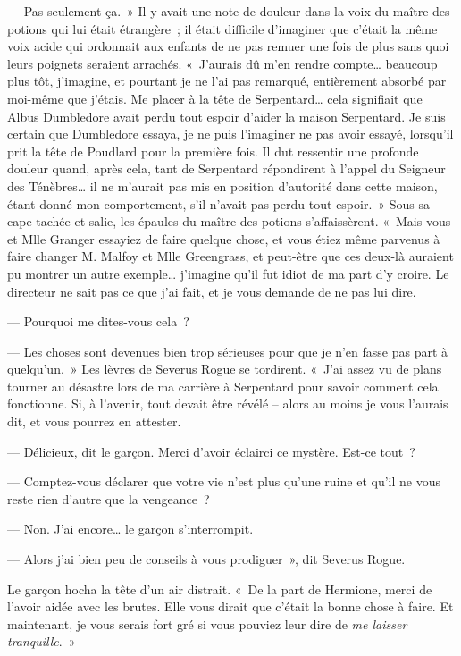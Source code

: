 --- Pas seulement ça.~» Il y avait une note de douleur dans la voix du maître des potions qui lui était étrangère~; il était difficile d'imaginer que c'était la même voix acide qui ordonnait aux enfants de ne pas remuer une fois de plus sans quoi leurs poignets seraient arrachés. «~J'aurais dû m'en rendre compte… beaucoup plus tôt, j'imagine, et pourtant je ne l'ai pas remarqué, entièrement absorbé par moi-même que j'étais. Me placer à la tête de Serpentard… cela signifiait que Albus Dumbledore avait perdu tout espoir d'aider la maison Serpentard. Je suis certain que Dumbledore essaya, je ne puis l'imaginer ne pas avoir essayé, lorsqu'il prit la tête de Poudlard pour la première fois. Il dut ressentir une profonde douleur quand, après cela, tant de Serpentard répondirent à l'appel du Seigneur des Ténèbres… il ne m'aurait pas mis en position d'autorité dans cette maison, étant donné mon comportement, s'il n'avait pas perdu tout espoir.~» Sous sa cape tachée et salie, les épaules du maître des potions s'affaissèrent. «~Mais vous et Mlle Granger essayiez de faire quelque chose, et vous étiez même parvenus à faire changer M. Malfoy et Mlle Greengrass, et peut-être que ces deux-là auraient pu montrer un autre exemple… j'imagine qu'il fut idiot de ma part d'y croire. Le directeur ne sait pas ce que j'ai fait, et je vous demande de ne pas lui dire.

--- Pourquoi me dites-vous cela~?

--- Les choses sont devenues bien trop sérieuses pour que je n'en fasse pas part à quelqu'un.~» Les lèvres de Severus Rogue se tordirent. «~J'ai assez vu de plans tourner au désastre lors de ma carrière à Serpentard pour savoir comment cela fonctionne. Si, à l'avenir, tout devait être révélé -- alors au moins je vous l'aurais dit, et vous pourrez en attester.

--- Délicieux, dit le garçon. Merci d'avoir éclairci ce mystère. Est-ce tout~?

--- Comptez-vous déclarer que votre vie n'est plus qu'une ruine et qu'il ne vous reste rien d'autre que la vengeance~?

--- Non. J'ai encore… le garçon s'interrompit.

--- Alors j'ai bien peu de conseils à vous prodiguer~», dit Severus Rogue.

Le garçon hocha la tête d'un air distrait. «~De la part de Hermione, merci de l'avoir aidée avec les brutes. Elle vous dirait que c'était la bonne chose à faire. Et maintenant, je vous serais fort gré si vous pouviez leur dire de \emph{me laisser tranquille}.~»

